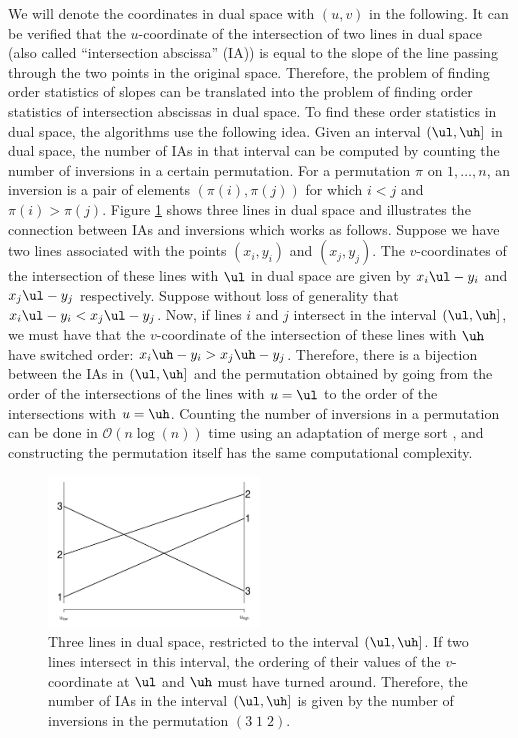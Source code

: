 We will denote the coordinates in dual space with $(u,v)$ in the following. It can be verified that the $u$-coordinate of the intersection of two lines in dual space (also called ``intersection abscissa'' (IA)) is equal to the slope of the line passing through the two points in the original space. Therefore, the problem of finding order statistics of slopes can be translated into the problem of finding order statistics of intersection abscissas in dual space. To find these order statistics in dual space, the algorithms use the following idea. Given an interval $(\ul,\uh]$ in dual space, the number of IAs in that interval can be computed by counting the number of inversions in a certain permutation. For a permutation $\pi$ on $1,\ldots,n$, an inversion is a pair of elements $(\pi(i),\pi(j))$ for which $i<j$ and $\pi(i) > \pi(j)$. Figure \ref{fig:illustrateInversions} shows three lines in dual space and illustrates the connection between IAs and inversions which works as follows. Suppose we have two lines associated with the points $(x_i,y_i)$ and $(x_j,y_j)$. The $v$-coordinates of the intersection of these lines with $\ul$ in dual space are given by $x_i \ul - y_i$ and $x_j\ul - y_j$ respectively. Suppose without loss of generality that $x_i \ul - y_i < x_j\ul - y_j$. Now, if lines $i$ and $j$ intersect in the interval $(\ul,\uh]$, we must have that the $v$-coordinate of the intersection of these lines with $\uh$ have switched order: $x_i \uh - y_i > x_j\uh - y_j$. Therefore, there is a bijection between the IAs in $(\ul,\uh]$ and the permutation obtained by going from the order of the intersections of the lines with $u =  \ul$ to the order of the intersections with $u = \uh$. Counting the number of inversions in a permutation can be done in $\mathcal{O}(n\log(n))$ time using an adaptation of merge sort \cite{knuth1998art}, and constructing the permutation itself has the same computational complexity. 
\begin{figure}[!ht]%
\centering
\includegraphics[width=0.5\textwidth]{illustration_inversions.pdf}%
\caption{Three lines in dual space, restricted to the interval $(\ul,\uh]$. If two lines intersect in this interval, the ordering of their values of the $v$-coordinate at $\ul$ and $\uh$ must have turned around. Therefore, the number of IAs in the interval $(\ul,\uh]$ is given by the number of inversions in the permutation $(3 \; 1 \; 2)$.}%
\label{fig:illustrateInversions}%
\end{figure}

